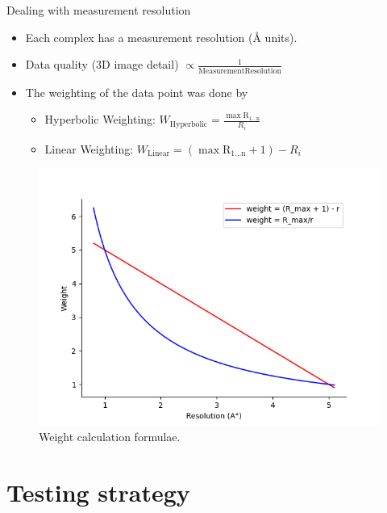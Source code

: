 \documentclass{beamer}
\begin{document}
\begin{frame}[t]{Dealing with measurement resolution}
\begin{itemize}
\item Each complex has a measurement resolution (\si{\angstrom} units).
\item Data quality (3D image detail) $\propto \frac{1}{\mathrm{Measurement
Resolution}}$
\item The weighting of the data point was done by
\begin{itemize}
\item Hyperbolic Weighting: $ W_\mathrm{Hyperbolic} = \frac{ \mathrm{\max{R_{1 ...  n}}}}{R_i}$
\item Linear Weighting: $W_\mathrm{Linear}  = (\mathrm{\max{R_{1 ...  n}}} + 1) - R_i$
\end{itemize} 
\end{itemize}

\begin{figure}
     \centering
         \centering
    \includegraphics[scale=0.40]{images/graphingformula}
    \caption{Weight calculation formulae.}
    \label{fig:graphingformula}
\end{figure}

\end{frame}




\section{Testing strategy}
\end{document}
